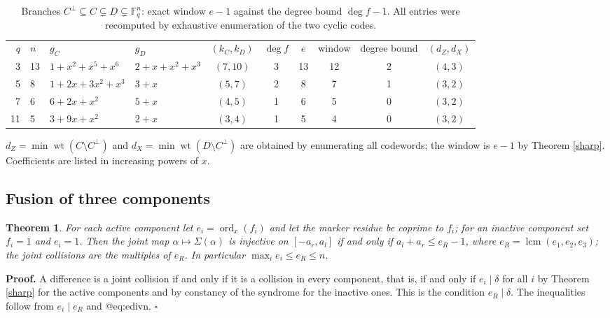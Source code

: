 \documentclass[11pt,reqno]{amsart}
\newtheorem{theorem}{Theorem}[section]
\theoremstyle{definition}
\theoremstyle{remark}
\newcommand{\F}{\mathbb{F}}
\newcommand{\wt}{\operatorname{wt}}
\newcommand{\ord}{\operatorname{ord}}
\newcommand{\lcm}{\operatorname{lcm}}
\begin{document}
\begin{table}[t]
\centering
\caption{Branches $C^\perp\subseteq C\subsetneq D\subsetneq\F_q^n$: exact window $e-1$ against the degree bound $\deg f-1$. All entries were recomputed by exhaustive enumeration of the two cyclic codes.\label{tab:single}}
\small
\begin{tabular}{rlllcccccc}
\toprule
$q$ & $n$ & $g_C$ & $g_D$ & $(k_C,k_D)$ & $\deg f$ & $e$ & window & degree bound & $(d_Z,d_X)$ \\
3 & 13 & $1+x^2+x^5+x^6$ & $2+x+x^2+x^3$ & $(7,10)$ & 3 & 13 & 12 & 2 & $(4,3)$ \\
5 & 8 & $1+2x+3x^2+x^3$ & $3+x$ & $(5,7)$ & 2 & 8 & 7 & 1 & $(3,2)$ \\
7 & 6 & $6+2x+x^2$ & $5+x$ & $(4,5)$ & 1 & 6 & 5 & 0 & $(3,2)$ \\
11 & 5 & $3+9x+x^2$ & $2+x$ & $(3,4)$ & 1 & 5 & 4 & 0 & $(3,2)$ \\
\bottomrule
\end{tabular}

\smallskip
\parbox{\linewidth}{\footnotesize $d_Z=\min\wt(C\setminus C^\perp)$ and $d_X=\min\wt(D\setminus C^\perp)$ are obtained by enumerating all codewords; the window is $e-1$ by Theorem \ref{sharp}. Coefficients are listed in increasing powers of $x$.}
\end{table}

\subsection{Fusion of three components}

\begin{theorem}\label{fused}
For each active component let $e_i=\ord_x(f_i)$ and let the marker residue be coprime to $f_i$; for an inactive component set $f_i=1$ and $e_i=1$. Then the joint map $\alpha\mapsto\Sigma(\alpha)$ is injective on $[-a_r,a_l]$ if and only if $a_l+a_r\le e_R-1$, where $e_R=\lcm(e_1,e_2,e_3)$; the joint collisions are the multiples of $e_R$. In particular $\max_ie_i\le e_R\le n$.
\end{theorem}

\textbf{Proof.} A difference is a joint collision if and only if it is a collision in every component, that is, if and only if $e_i\mid\delta$ for all $i$ by Theorem \ref{sharp} for the active components and by constancy of the syndrome for the inactive ones. This is the condition $e_R\mid\delta$. The inequalities follow from $e_i\mid e_R$ and @eq:edivn. $\square$
\end{document}
